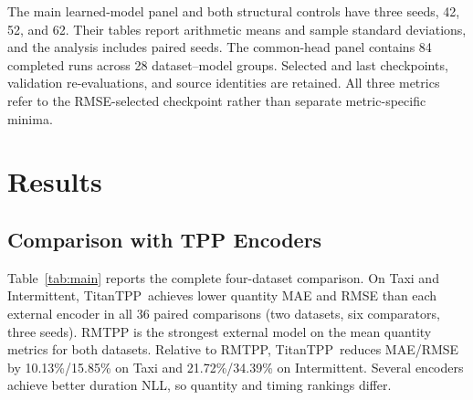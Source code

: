 \documentclass[runningheads]{llncs}
\newcommand{\method}{TitanTPP}
\begin{document}
The main learned-model panel and both structural controls have three seeds,
42, 52, and 62. Their tables report arithmetic means and sample standard
deviations, and the analysis includes paired seeds.
The common-head panel contains 84 completed runs across 28 dataset--model
groups. Selected and last checkpoints, validation re-evaluations, and source
identities are retained. All three metrics refer to the RMSE-selected
checkpoint rather than separate metric-specific minima.

\section{Results}
\subsection{Comparison with TPP Encoders}
Table~\ref{tab:main} reports the complete four-dataset comparison. On Taxi
and Intermittent, \method\ achieves lower quantity MAE and RMSE than each
external encoder in all 36 paired comparisons (two datasets, six comparators,
three seeds). RMTPP is the strongest external model on the mean quantity
metrics for both datasets. Relative to RMTPP, \method\ reduces MAE/RMSE by
10.13\%/15.85\% on Taxi and 21.72\%/34.39\% on Intermittent. Several encoders
achieve better duration NLL, so quantity and timing rankings differ.
\end{document}
